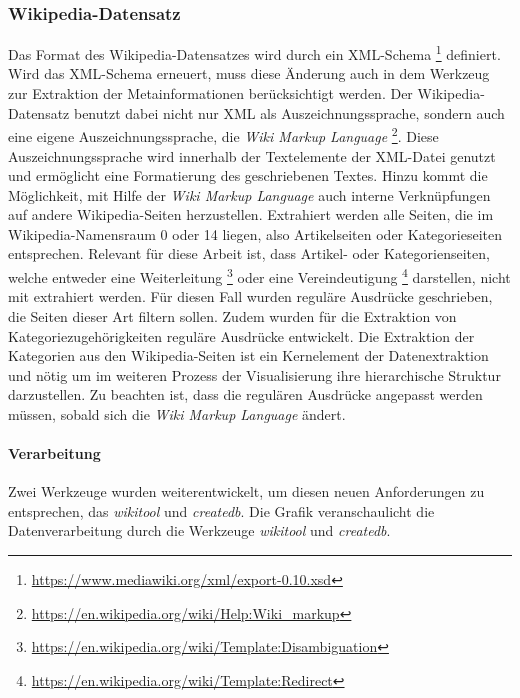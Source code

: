 \subsubsection*{Wikipedia-Datensatz}
Das Format des Wikipedia-Datensatzes wird durch ein XML-Schema \footnote{\url{https://www.mediawiki.org/xml/export-0.10.xsd}} definiert.
Wird das XML-Schema erneuert, muss diese Änderung auch in dem Werkzeug zur Extraktion der Metainformationen berücksichtigt werden.
Der Wikipedia-Datensatz benutzt dabei nicht nur XML als Auszeichnungssprache, sondern auch eine eigene Auszeichnungssprache, die \emph{Wiki Markup Language} \footnote{\url{https://en.wikipedia.org/wiki/Help:Wiki\_markup}}. 
Diese Auszeichnungssprache wird innerhalb der Textelemente der XML-Datei genutzt und ermöglicht eine Formatierung des geschriebenen Textes.
Hinzu kommt die Möglichkeit, mit Hilfe der \emph{Wiki Markup Language} auch interne Verknüpfungen auf andere Wikipedia-Seiten herzustellen.
Extrahiert werden alle Seiten, die im Wikipedia-Namensraum 0 oder 14 liegen, also Artikelseiten oder Kategorieseiten entsprechen.
Relevant für diese Arbeit ist, dass Artikel- oder Kategorienseiten, welche entweder eine Weiterleitung \footnote{\url{https://en.wikipedia.org/wiki/Template:Disambiguation}} oder eine Vereindeutigung \footnote{\url{https://en.wikipedia.org/wiki/Template:Redirect}} darstellen, nicht mit extrahiert werden.
Für diesen Fall wurden reguläre Ausdrücke geschrieben, die Seiten dieser Art filtern sollen. Zudem wurden für die Extraktion von Kategoriezugehörigkeiten reguläre Ausdrücke entwickelt.
Die Extraktion der Kategorien aus den Wikipedia-Seiten ist ein Kernelement der Datenextraktion und nötig um im weiteren Prozess der Visualisierung ihre hierarchische Struktur darzustellen.
Zu beachten ist, dass die regulären Ausdrücke angepasst werden müssen, sobald sich die \emph{Wiki Markup Language} ändert.

\paragraph{Verarbeitung}
Zwei Werkzeuge wurden weiterentwickelt, um diesen neuen Anforderungen zu entsprechen, das \emph{wikitool} und \emph{createdb}.
Die Grafik  veranschaulicht die Datenverarbeitung durch die Werkzeuge \emph{wikitool} und \emph{createdb}.


